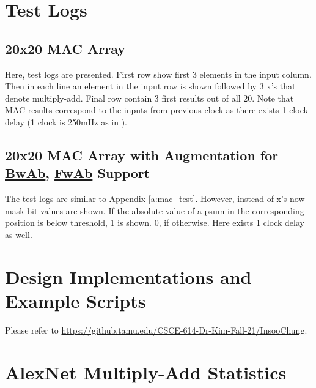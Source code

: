 \documentclass[11pt]{article}
\begin{document}
\newpage
\appendix
\section{Test Logs}

\subsection{20x20 MAC Array \label{a:mac_test}}
Here, test logs are presented. First row show first 3 elements in the input column. Then in each line an element in the input row is shown followed by 3 x's that denote multiply-add. Final row contain 3 first results out of all 20. Note that MAC results correspond to the inputs from previous clock as there exists 1 clock delay (1 clock is 250mHz as in \cite{ptolemy}).

\begin{multicols}{3}
{\tiny }    
\end{multicols}

\subsection{20x20 MAC Array with Augmentation for \underline{BwAb}, \underline{FwAb} Support\label{a:mac_aug_test}}
The test logs are similar to Appendix \ref{a:mac_test}. However, instead of x's now mask bit values are shown. If the absolute value of a psum in the corresponding position is below threshold, 1 is shown. 0, if otherwise. Here exists 1 clock delay as well.


\begin{multicols}{3}
    {\tiny }    
\end{multicols}


\section{Design Implementations and Example Scripts}
Please refer to \url{https://github.tamu.edu/CSCE-614-Dr-Kim-Fall-21/InsooChung}.

\section{AlexNet Multiply-Add Statistics\label{a:alex}}
\end{document}
